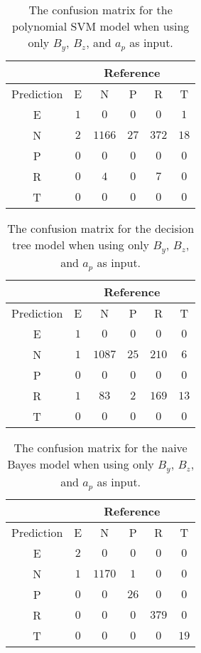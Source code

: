 \begin{table}[!ht]
	\centering
	\begin{tabular}{|c|c|c|c|c|c|}
		\hline
		 & \multicolumn{5}{|c|}{Reference} \\ \hline
		 Prediction & E & N & P & R & T \\ \hline
		 E & $1$ & $0$ & $0$ & $0$ & $1$ \\ \hline
		 N & $2$ & $1166$ & $27$ & $372$ & $18$ \\ \hline
		 P & $0$ & $0$ & $0$ & $0$ & $0$ \\ \hline
		 R & $0$ & $4$ & $0$ & $7$ & $0$ \\ \hline
		 T & $0$ & $0$ & $0$ & $0$ & $0$ \\ \hline
	\end{tabular}
	\caption{The confusion matrix for the polynomial SVM model when using only $B_{y}$, $B_{z}$, and $a_{p}$ as input.}
	\label{tab:cm:yzap:svmPoly}
\end{table}

\begin{table}[!ht]
	\centering
	\begin{tabular}{|c|c|c|c|c|c|}
		\hline
		 & \multicolumn{5}{|c|}{Reference} \\ \hline
		 Prediction & E & N & P & R & T \\ \hline
		 E & $1$ & $0$ & $0$ & $0$ & $0$ \\ \hline
		 N & $1$ & $1087$ & $25$ & $210$ & $6$ \\ \hline
		 P & $0$ & $0$ & $0$ & $0$ & $0$ \\ \hline
		 R & $1$ & $83$ & $2$ & $169$ & $13$ \\ \hline
		 T & $0$ & $0$ & $0$ & $0$ & $0$ \\ \hline
	\end{tabular}
	\caption{The confusion matrix for the decision tree model when using only $B_{y}$, $B_{z}$, and $a_{p}$ as input.}
	\label{tab:cm:yzap:C5.0}
\end{table}

\begin{table}[!ht]
	\centering
	\begin{tabular}{|c|c|c|c|c|c|}
		\hline
		 & \multicolumn{5}{|c|}{Reference} \\ \hline
		 Prediction & E & N & P & R & T \\ \hline
		 E & $2$ & $0$ & $0$ & $0$ & $0$ \\ \hline
		 N & $1$ & $1170$ & $1$ & $0$ & $0$ \\ \hline
		 P & $0$ & $0$ & $26$ & $0$ & $0$ \\ \hline
		 R & $0$ & $0$ & $0$ & $379$ & $0$ \\ \hline
		 T & $0$ & $0$ & $0$ & $0$ & $19$ \\ \hline
	\end{tabular}
	\caption{The confusion matrix for the naive Bayes model when using only $B_{y}$, $B_{z}$, and $a_{p}$ as input.}
	\label{tab:cm:yzap:nb}
\end{table}

